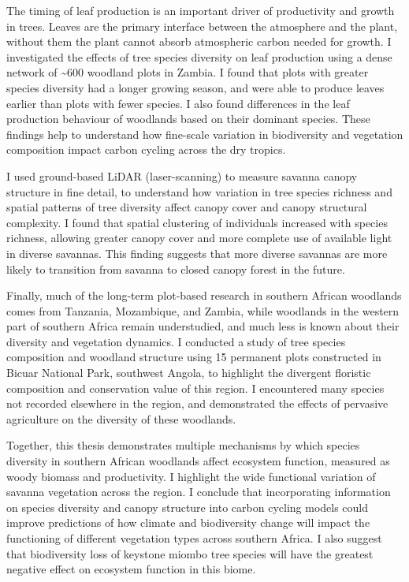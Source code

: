 The timing of leaf production is an important driver of productivity and growth in trees. Leaves are the primary interface between the atmosphere and the plant, without them the plant cannot absorb atmospheric carbon needed for growth. I investigated the effects of tree species diversity on leaf production using a dense network of \textasciitilde{}600 woodland plots in Zambia. I found that plots with greater species diversity had a longer growing season, and were able to produce leaves earlier than plots with fewer species. I also found differences in the leaf production behaviour of woodlands based on their dominant species. These findings help to understand how fine-scale variation in biodiversity and vegetation composition impact carbon cycling across the dry tropics.

I used ground-based LiDAR (laser-scanning) to measure savanna canopy structure in fine detail, to understand how variation in tree species richness and spatial patterns of tree diversity affect canopy cover and canopy structural complexity. I found that spatial clustering of individuals increased with species richness, allowing greater canopy cover and more complete use of available light in diverse savannas. This finding suggests that more diverse savannas are more likely to transition from savanna to closed canopy forest in the future.

Finally, much of the long-term plot-based research in southern African woodlands comes from Tanzania, Mozambique, and Zambia, while woodlands in the western part of southern Africa remain understudied, and much less is known about their diversity and vegetation dynamics. I conducted a study of tree species composition and woodland structure using 15 permanent plots constructed in Bicuar National Park, southwest Angola, to highlight the divergent floristic composition and conservation value of this region. I encountered many species not recorded elsewhere in the region, and demonstrated the effects of pervasive agriculture on the diversity of these woodlands. 

Together, this thesis demonstrates multiple mechanisms by which species diversity in southern African woodlands affect ecosystem function, measured as woody biomass and productivity. I highlight the wide functional variation of savanna vegetation across the region. I conclude that incorporating information on species diversity and canopy structure into carbon cycling models could improve predictions of how climate and biodiversity change will impact the functioning of different vegetation types across southern Africa. I also suggest that biodiversity loss of keystone miombo tree species will have the greatest negative effect on ecosystem function in this biome.
